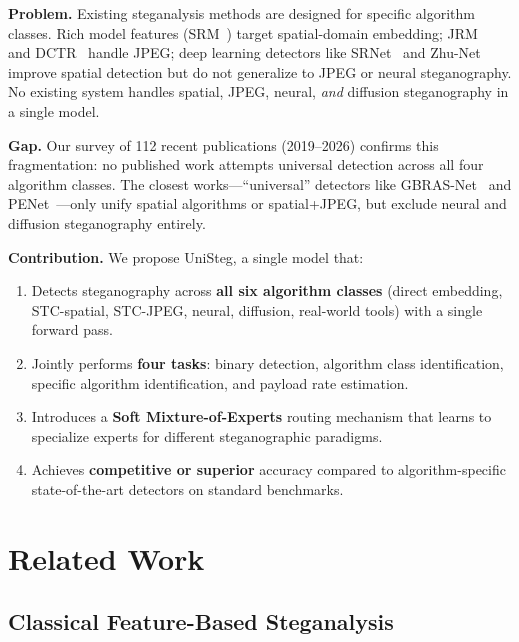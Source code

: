 \documentclass[conference]{IEEEtran}
\newcommand{\method}{UniSteg}
\begin{document}
\textbf{Problem.}
Existing steganalysis methods are designed for specific algorithm classes.
Rich model features (SRM~\cite{fridrich2012rich}) target spatial-domain embedding; JRM~\cite{kodovsky2012steganalysis} and DCTR~\cite{holub2015low} handle JPEG; deep learning detectors like SRNet~\cite{boroumand2019deep} and Zhu-Net~\cite{zhang2020zhu} improve spatial detection but do not generalize to JPEG or neural steganography.
No existing system handles spatial, JPEG, neural, \emph{and} diffusion steganography in a single model.

\textbf{Gap.}
Our survey of 112 recent publications (2019--2026) confirms this fragmentation: no published work attempts universal detection across all four algorithm classes.
The closest works---``universal'' detectors like GBRAS-Net~\cite{reinel2021gbras} and PENet~\cite{deng2024penet}---only unify spatial algorithms or spatial+JPEG, but exclude neural and diffusion steganography entirely.

\textbf{Contribution.}
We propose \method{}, a single model that:
\begin{enumerate}
  \item Detects steganography across \textbf{all six algorithm classes} (direct embedding, STC-spatial, STC-JPEG, neural, diffusion, real-world tools) with a single forward pass.
  \item Jointly performs \textbf{four tasks}: binary detection, algorithm class identification, specific algorithm identification, and payload rate estimation.
  \item Introduces a \textbf{Soft Mixture-of-Experts} routing mechanism that learns to specialize experts for different steganographic paradigms.
  \item Achieves \textbf{competitive or superior} accuracy compared to algorithm-specific state-of-the-art detectors on standard benchmarks.
\end{enumerate}

\section{Related Work}
\label{sec:related}

\subsection{Classical Feature-Based Steganalysis}

\end{document}
